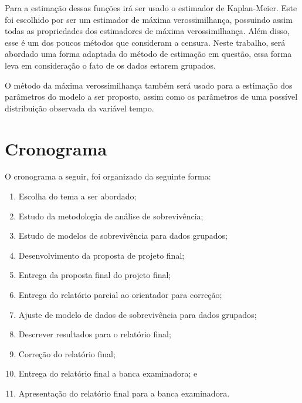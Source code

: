\documentclass[a4paper,12pt]{article}
\begin{document}
Para a estimação dessas funções irá ser usado o estimador de Kaplan-Meier. Este foi escolhido por ser um estimador de máxima verossimilhança, possuindo assim todas as propriedades dos estimadores de máxima verossimilhança. Além disso, esse é um dos poucos métodos que consideram a censura. Neste trabalho, será abordado uma forma adaptada do método de estimação em questão, essa forma leva em consideração o fato de os dados estarem grupados.

O método da máxima verossimilhança também será usado para a estimação dos parâmetros do modelo a ser proposto, assim como os parâmetros de uma possível distribuição observada da variável tempo.

	
\section{Cronograma}

O cronograma a seguir, foi organizado da seguinte forma:

\begin{enumerate}
	\item Escolha do tema a ser abordado;
	\item Estudo da metodologia de análise de sobrevivência;
	\item Estudo de modelos de sobrevivência para dados grupados;
	\item Desenvolvimento da proposta de projeto final;	
	\item Entrega da proposta final do projeto final;
	\item Entrega do relatório parcial ao orientador para correção;
	\item Ajuste de modelo de dados de sobrevivência para dados grupados;
	\item Descrever resultados para o relatório final;
	\item Correção do relatório final;
	\item Entrega do relatório final a banca examinadora; e
	\item Apresentação do relatório final para a banca examinadora.
\end{enumerate}
		
\end{document}
